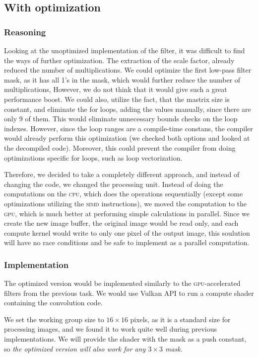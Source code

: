\documentclass[12pt]{article}
\begin{document}
\subsection{With optimization}

\subsubsection{Reasoning}

Looking at the unoptimized implementation of the filter, it was difficult to find the ways of further optimization.
The extraction of the scale factor, already reduced the number of multiplications.
We could optimize the first low-pass filter mask, as it has all 1's in the mask, which would further reduce the number of multiplications,
However, we do not think that it would give such a great performance boost.
We could also, utilize the fact, that the mastrix size is constant, and eliminate the for loops, adding the values manually, since there are only 9 of them.
This would eliminate unnecessary bounds checks on the loop indexes.
However, since the loop ranges are a compile-time constans, the compiler would already perform this optimization (we checked both options and looked at the decompiled code).
Moreover, this could prevent the compiler from doing optimizations specific for loops, such as loop vectorization.

Therefore, we decided to take a completely different approach, and instead of changing the code, we changed the processing unit.
Instead of doing the computations on the \textsc{cpu}, which does the operations sequentially (except some optimizations utilizing the \textsc{simd} instructions),
we moved the computation to the \textsc{gpu}, which is much better at performing simple calculations in parallel.
Since we create the new image buffer, the original image would be read only, and each compute kernel would write to only one pixel of the output image,
this soulution will have no race conditions and be safe to implement as a parallel computation.

\subsubsection{Implementation}
The optimized version would be implemented similarly to the \textsc{gpu}-accelerated filters from the previous task.
We would use Vulkan API to run a compute shader containing the convolution code.

We set the working group size to $16\times16$ pixels, as it is a standard size for processing images,
and we found it to work quite well during previous implementations.
We will provide the shader with the mask as a push constant, so \emph{the optimized version will also work for any $3\times3$ mask}.
\end{document}
